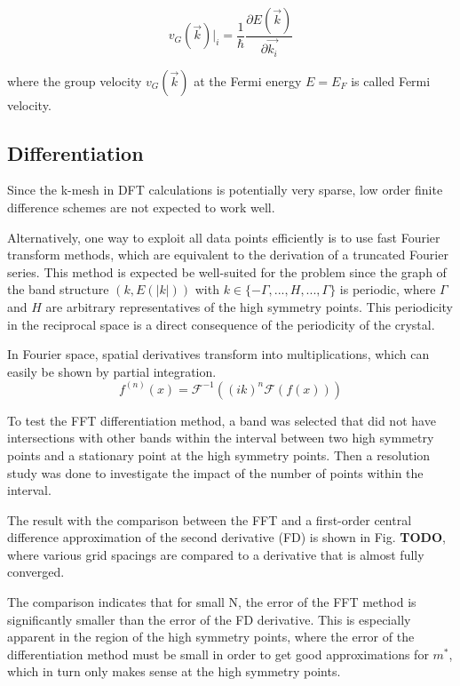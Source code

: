 \begin{equation}
    v_{G}(\vec{k})\big|_i = \frac{1}{\hbar}\frac{\partial E(\vec{k})}{\partial \vec{k_i}}
\end{equation}

where the group velocity $v_{G}(\vec{k})$ at the Fermi energy $E = E_F$ is called Fermi velocity.



\subsection{Differentiation}

Since the k-mesh in DFT calculations is potentially very sparse, low order finite difference schemes are not expected to work well.

Alternatively, one way to exploit all data points efficiently is to use fast Fourier transform methods, which are equivalent to the derivation of a truncated Fourier series. This method is expected be well-suited for the problem since the graph of the band structure $(k, E(|k|))$ with $k \in \{-\Gamma,..., H,..., \Gamma\}$ is periodic, where $\Gamma$ and $H$ are arbitrary representatives of the high symmetry points. This periodicity in the reciprocal space is a direct consequence of the periodicity of the crystal.


In Fourier space, spatial derivatives transform into multiplications, which can easily be shown by partial integration.
\begin{equation}
    f^{(n)}(x) = \mathcal{F}^{-1}\left((ik)^n\mathcal{F}(f(x))\right)
\end{equation}
 
To test the FFT differentiation method, a band was selected that did not have intersections with other bands within the interval between two high symmetry points and a stationary point at the high symmetry points. Then a resolution study was done to investigate the impact of the number of points within the interval.

The result with the comparison between the FFT and a first-order central
difference approximation of the second derivative (FD) is shown in Fig. \textbf{TODO}, where
various grid spacings are compared to a derivative that is almost fully converged.

The comparison indicates that for small N, the error of the FFT method is significantly smaller than the error of the FD derivative. This is especially apparent in the region of the high symmetry points, where the error of the differentiation method must be small in order to get good approximations for $m^{*}$, which in turn only makes sense at the high symmetry points.


